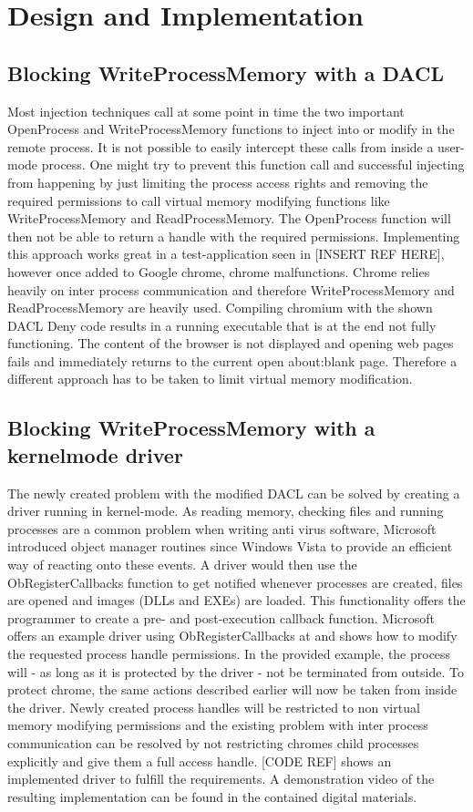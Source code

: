\section{Design and Implementation}
\label{chap_implementation}
\subsection{Blocking WriteProcessMemory with a DACL}
\label{sec:implementation_dacl}
Most injection techniques call at some point in time the two important OpenProcess and WriteProcessMemory functions to inject into or modify in the remote process. It is not possible to easily intercept these calls from inside a user-mode process. One might try to prevent this function call and successful injecting from happening by just limiting the process access rights and removing the required permissions to call virtual memory modifying functions like WriteProcessMemory and ReadProcessMemory. The OpenProcess function will then not be able to return a handle with the required permissions. Implementing this approach works great in a test-application seen in [INSERT REF HERE], however once added to Google chrome, chrome malfunctions. Chrome relies heavily on inter process communication and therefore WriteProcessMemory and ReadProcessMemory are heavily used. Compiling chromium with the shown DACL Deny code results in a running executable that is at the end not fully functioning. The content of the browser is not displayed and opening web pages fails and immediately returns to the current open about:blank page. Therefore a different approach has to be taken to limit virtual memory modification.

\subsection{Blocking WriteProcessMemory with a kernelmode driver}
The newly created problem with the modified DACL can be solved by creating a driver running in kernel-mode. As reading memory, checking files and running processes are a common problem when writing anti virus software, Microsoft introduced object manager routines since Windows Vista to provide an efficient way of reacting onto these events. A driver would then use the ObRegisterCallbacks function to get notified whenever processes are created, files are opened and images (DLLs and EXEs) are loaded. This functionality offers the programmer to create a pre- and post-execution callback function. Microsoft offers an example driver using ObRegisterCallbacks at \cite{github_obcallback} and shows how to modify the requested process handle permissions. In the provided example, the process will - as long as it is protected by the driver - not be terminated from outside. To protect chrome, the same actions described earlier will now be taken from inside the driver. Newly created process handles will be restricted to non virtual memory modifying permissions and the existing problem with inter process communication can be resolved by not restricting chromes child processes explicitly and give them a full access handle. [CODE REF] shows an implemented driver to fulfill the requirements. A demonstration video of the resulting implementation can be found in the contained digital materials.

